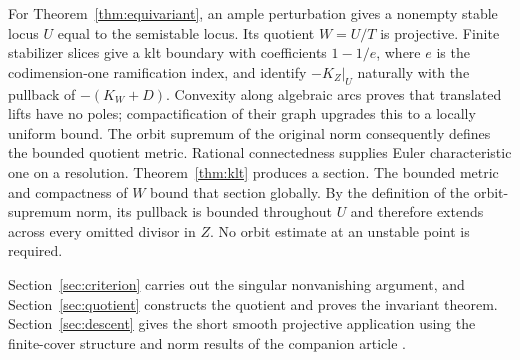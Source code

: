 For Theorem~\ref{thm:equivariant}, an ample perturbation gives a nonempty stable locus $U$ equal to the semistable locus. Its quotient $W=U/T$ is projective. Finite stabilizer slices give a klt boundary with coefficients $1-1/e$, where $e$ is the codimension-one ramification index, and identify $-K_Z|_U$ naturally with the pullback of $-(K_W+D)$. Convexity along algebraic arcs proves that translated lifts have no poles; compactification of their graph upgrades this to a locally uniform bound. The orbit supremum of the original norm consequently defines the bounded quotient metric. Rational connectedness supplies Euler characteristic one on a resolution. Theorem~\ref{thm:klt} produces a section. The bounded metric and compactness of $W$ bound that section globally. By the definition of the orbit-supremum norm, its pullback is bounded throughout $U$ and therefore extends across every omitted divisor in $Z$. No orbit estimate at an unstable point is required.

Section~\ref{sec:criterion} carries out the singular nonvanishing argument, and Section~\ref{sec:quotient} constructs the quotient and proves the invariant theorem. Section~\ref{sec:descent} gives the short smooth projective application using the finite-cover structure and norm results of the companion article \cite{SmoothCompanion}.
